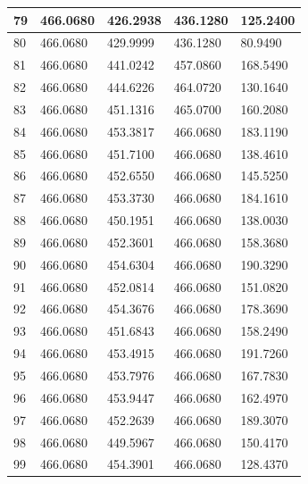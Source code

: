 \begin{longtable}{|l|l|l|l|l|}
79 & 466.0680 & 426.2938 & 436.1280 & 125.2400 \\\hline
80 & 466.0680 & 429.9999 & 436.1280 & 80.9490 \\\hline
81 & 466.0680 & 441.0242 & 457.0860 & 168.5490 \\\hline
82 & 466.0680 & 444.6226 & 464.0720 & 130.1640 \\\hline
83 & 466.0680 & 451.1316 & 465.0700 & 160.2080 \\\hline
84 & 466.0680 & 453.3817 & 466.0680 & 183.1190 \\\hline
85 & 466.0680 & 451.7100 & 466.0680 & 138.4610 \\\hline
86 & 466.0680 & 452.6550 & 466.0680 & 145.5250 \\\hline
87 & 466.0680 & 453.3730 & 466.0680 & 184.1610 \\\hline
88 & 466.0680 & 450.1951 & 466.0680 & 138.0030 \\\hline
89 & 466.0680 & 452.3601 & 466.0680 & 158.3680 \\\hline
90 & 466.0680 & 454.6304 & 466.0680 & 190.3290 \\\hline
91 & 466.0680 & 452.0814 & 466.0680 & 151.0820 \\\hline
92 & 466.0680 & 454.3676 & 466.0680 & 178.3690 \\\hline
93 & 466.0680 & 451.6843 & 466.0680 & 158.2490 \\\hline
94 & 466.0680 & 453.4915 & 466.0680 & 191.7260 \\\hline
95 & 466.0680 & 453.7976 & 466.0680 & 167.7830 \\\hline
96 & 466.0680 & 453.9447 & 466.0680 & 162.4970 \\\hline
97 & 466.0680 & 452.2639 & 466.0680 & 189.3070 \\\hline
98 & 466.0680 & 449.5967 & 466.0680 & 150.4170 \\\hline
99 & 466.0680 & 454.3901 & 466.0680 & 128.4370 \\\hline
\end{longtable}
